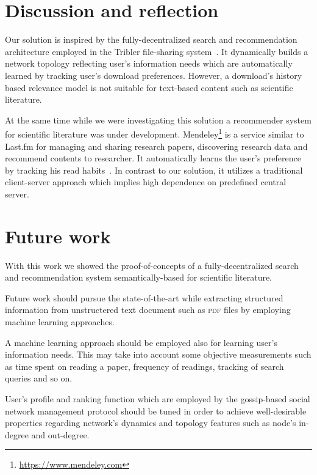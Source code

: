 \section{Discussion and reflection}
Our solution is inspired by the fully-decentralized search and recommendation architecture employed in the Tribler file-sharing system~\cite{PGW+08}. It dynamically builds a network topology reflecting user's information needs which are automatically learned by tracking user's download preferences. However, a download's history based relevance model is not suitable for text-based content such as scientific literature.

At the same time while we were investigating this solution a recommender system for scientific literature was under development. Mendeley\footnote{\url{https://www.mendeley.com}} is a service similar to Last.fm%
for managing and sharing research papers, discovering research data and recommend contents to researcher. It automatically learns the user's preference by tracking his read habits~\cite{HR08}. In contrast to our solution, it utilizes a traditional client-server approach which implies high dependence on predefined central server.



\section{Future work}
With this work we showed the proof-of-concepts of a fully-decentralized search and recommendation system semantically-based for scientific literature.

Future work should pursue the state-of-the-art while extracting structured information from unstructered text document such as \textsc{pdf} files by employing machine learning approaches.

A machine learning approach should be employed also for learning user's information needs. This may take into account some objective measurements such as time spent on reading a paper, frequency of readings, tracking of search queries and so on.

User's profile and ranking function which are employed by the gossip-based social network management protocol should be tuned in order to achieve well-desirable properties regarding network's dynamics and topology features such as node's in-degree and out-degree.

